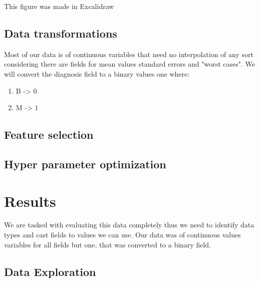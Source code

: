 \documentclass[12pt, a4paper]{article}
\begin{document}
\begin{multicols}{2}

    This figure was made in Excalidraw \cite{}
    \newline

    \subsection{Data transformations} \label{subsec:transforms}

    Most of our data is of continuous variables that need no interpolation of any sort considering there are fields for mean values standard errors and "worst cases". We will convert the diagnosis field to a binary values one where:
    \newline

    \begin{enumerate} \label{enm:casting}
        \item B -> $0$
        \item M -> $1$
    \end{enumerate}

    \subsection{Feature selection} \label{subsec:fselect}

    \subsection{Hyper parameter optimization} \label{subsec:optuna}

    \section{Results} \label{sec:res}

    We are tasked with evaluating this data completely thus we need to identify data types and cast fields to values we can use. Our data was of continuous values variables for all fields but one, that was converted to a binary field.
    \newline

    \subsection{Data Exploration} \label{subsec:expl}

\end{multicols}
\end{document}

